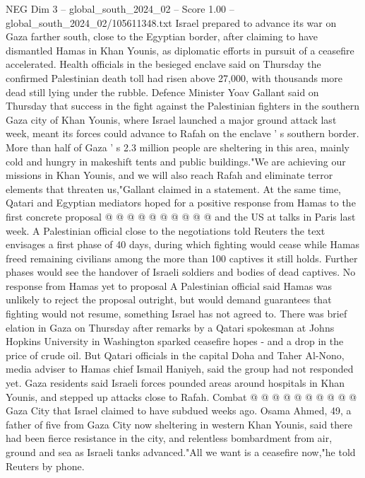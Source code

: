 \begin{textsample}{NEG Dim 3 – global\_south\_2024\_02 – Score 1.00 – global\_south\_2024\_02/105611348.txt}  \label{ex:f3_neg_096}
Israel prepared to advance its war on Gaza farther south, close to the Egyptian border, after claiming to have dismantled Hamas in Khan Younis, as diplomatic efforts in pursuit of a ceasefire accelerated.
Health officials in the besieged enclave said on Thursday the confirmed Palestinian death toll had risen above 27,000, with thousands more dead still lying under the rubble.
Defence Minister Yoav Gallant said on Thursday that success in the fight against the Palestinian fighters in the southern Gaza city of Khan Younis, where Israel launched a major ground attack last week, meant its forces could advance to Rafah on the enclave ' s southern border.
More than half of Gaza ' s 2.3 million people are sheltering in this area, mainly cold and hungry in makeshift tents and public buildings."We are achieving our missions in Khan Younis, and we will also reach Rafah and eliminate terror elements that threaten us,"Gallant claimed in a statement.
At the same time, Qatari and Egyptian mediators hoped for a positive response from Hamas to the first concrete proposal @ @ @ @ @ @ @ @ @ @ and the US at talks in Paris last week.
A Palestinian official close to the negotiations told Reuters the text envisages a first phase of 40 days, during which fighting would cease while Hamas freed remaining civilians among the more than 100 captives it still holds.
Further phases would see the handover of Israeli soldiers and bodies of dead captives.
No response from Hamas yet to proposal A Palestinian official said Hamas was unlikely to reject the proposal outright, but would demand guarantees that fighting would not resume, something Israel has not agreed to.
There was brief elation in Gaza on Thursday after remarks by a Qatari spokesman at Johns Hopkins University in Washington sparked ceasefire hopes - and a drop in the price of crude oil.
But Qatari officials in the capital Doha and Taher Al-Nono, media adviser to Hamas chief Ismail Haniyeh, said the group had not responded yet.
Gaza residents said Israeli forces pounded areas around hospitals in Khan Younis, and stepped up attacks close to Rafah.
Combat @ @ @ @ @ @ @ @ @ @ Gaza City that Israel claimed to have subdued weeks ago.
Osama Ahmed, 49, a father of five from Gaza City now sheltering in western Khan Younis, said there had been fierce resistance in the city, and relentless bombardment from air, ground and sea as Israeli tanks advanced."All we want is a ceasefire now,"he told Reuters by phone.

\end{textsample}

